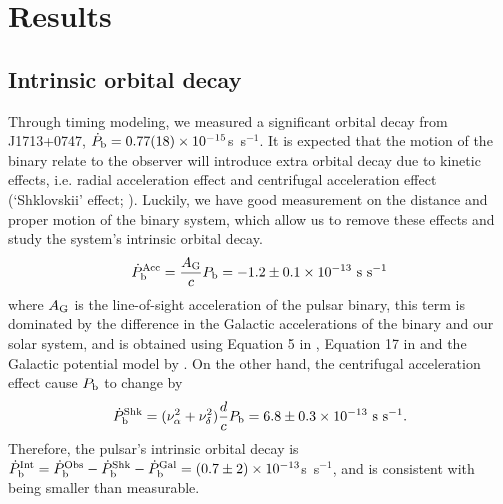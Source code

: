 \section{Results}
\label{sec:res}

\subsection{Intrinsic orbital decay}
\label{sec:obdecay}
Through timing modeling, we measured a significant orbital decay from
J1713+0747, $\dot{P}_{\rm b} = 0.77(18)\times10^{-15}$s~s$^{-1}$. 
It is expected that the motion of the binary relate to the observer will introduce extra orbital decay due to kinetic effects, i.e. radial acceleration effect \citep{dt91} and centrifugal acceleration effect (`Shklovskii' effect; \citealt{shk70}). Luckily, we have good measurement on the distance and proper motion of the binary system, which allow us to remove these effects 
and study the system's intrinsic orbital decay.
\begin{equation}
\dot{P}_{\rm b}^{\rm Acc} = \frac{A_{\rm G}}{c} P_{\rm b} =
-1.2\pm0.1\times10^{-13}~{\rm s~s^{-1}}
\end{equation}
where $A_{\rm G}$ is the line-of-sight acceleration of the pulsar binary,
this term is dominated by the difference in the Galactic accelerations of the
binary and our solar system, and is obtained using
Equation 5 in \citet{nt95}, Equation 17 in \citet{lwj+09} and the Galactic
potential model by \citet{hf04a}.
On the other hand, the centrifugal acceleration effect cause $P_{\rm b}$ to
change by
\begin{equation}
\dot{P}_{\rm b}^{\rm Shk} = (\nu_{\alpha}^2+\nu_{\delta}^2)\frac{d}{c}P_{\rm
b} = 6.8\pm0.3\times10^{-13}~{\rm s~s^{-1}}.
\end{equation}
Therefore, the pulsar's intrinsic orbital decay is $\dot{P}_{\rm b}^{\rm Int}
= \dot{P}_{\rm b}^{\rm Obs} - \dot{P}_{\rm b}^{\rm Shk} - \dot{P}_{\rm b}^{\rm
Gal} = (0.7\pm2)\times10^{-13}$s~s$^{-1}$, and is consistent with being smaller than measurable.


